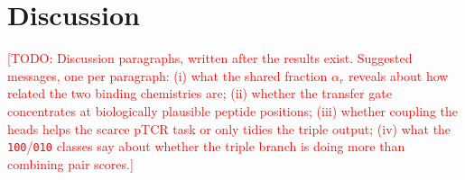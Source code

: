 \documentclass[webpdf,modern,large,namedate]{oup-authoring-template}
\theoremstyle{thmstyleone}
\theoremstyle{thmstyletwo}
\theoremstyle{thmstylethree}
\DeclareRobustCommand{\TODO}[1]{\textcolor{red}{[TODO: #1]}}
\newcommand{\PT}{pTCR}
\begin{document}
\section{Discussion}\label{sec:discussion}

\TODO{Discussion paragraphs, written after the results exist. Suggested
messages, one per paragraph: (i) what the shared fraction $\alpha_r$ reveals
about how related the two binding chemistries are; (ii) whether the
transfer gate concentrates at biologically plausible peptide positions;
(iii) whether coupling the heads helps the scarce \PT{} task or only tidies the
triple output; (iv) what the \texttt{100}/\texttt{010} classes say about
whether the triple branch is doing more than combining pair scores.}
\end{document}
